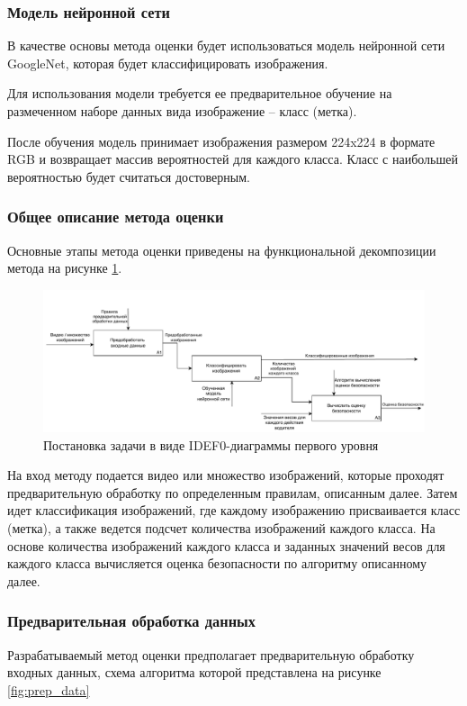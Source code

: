 \subsubsection{Модель нейронной сети}
В качестве основы метода оценки будет использоваться модель нейронной сети GoogleNet, которая будет классифицировать изображения.

Для использования модели требуется ее предварительное обучение на размеченном наборе данных вида изображение -- класс (метка).

После обучения модель принимает изображения размером 224x224  в формате RGB  и возвращает массив вероятностей для каждого класса. Класс с наибольшей вероятностью будет считаться достоверным.

\subsubsection{Общее описание метода оценки}
Основные этапы метода оценки приведены на функциональной декомпозиции метода на рисунке  \ref{fig:idef0_A1}.

 \begin{figure}[hbtp]
	\centering
	\includegraphics[width=\textwidth]{img/idef0_A1.pdf}
	\caption{Постановка задачи в виде IDEF0-диаграммы первого уровня}
	\label{fig:idef0_A1}
\end{figure}

На вход методу подается видео или множество изображений,
которые проходят предварительную обработку по определенным правилам, описанным далее.  Затем идет классификация изображений, где каждому изображению присваивается класс (метка), а также ведется подсчет количества изображений каждого класса. На основе количества изображений каждого класса  и заданных значений весов для каждого класса вычисляется оценка безопасности по алгоритму описанному далее.

\subsubsection{Предварительная обработка данных}
Разрабатываемый метод оценки предполагает предварительную обработку входных данных, схема алгоритма которой представлена на рисунке \ref{fig:prep_data}


